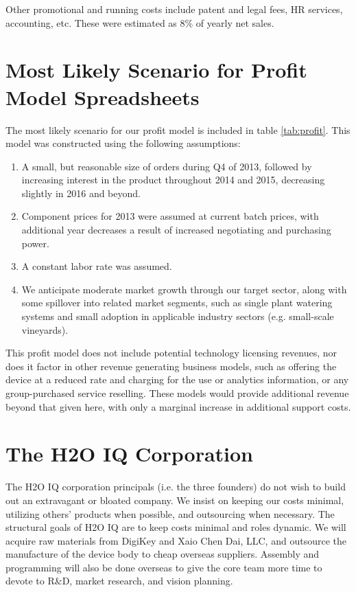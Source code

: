 \documentclass[11pt]{article}
\begin{document}
Other promotional and running costs include patent and legal fees, HR services, accounting, etc. These were estimated as 8\% of yearly net sales.

\section{Most Likely Scenario for Profit Model Spreadsheets}

The most likely scenario for our profit model is included in table \ref{tab:profit}. This model was constructed using the following assumptions:
\begin{enumerate}
\item A small, but reasonable size of orders during Q4 of 2013, followed by increasing interest in the product throughout 2014 and 2015, decreasing slightly in 2016 and beyond.
\item Component prices for 2013 were assumed at current batch prices, with additional year decreases a result of increased negotiating and purchasing power.
\item A constant labor rate was assumed.
\item We anticipate moderate market growth through our target sector, along with some spillover into related market segments, such as single plant watering systems and small adoption in applicable industry sectors (e.g. small-scale vineyards).
\end{enumerate}

This profit model does not include potential technology licensing revenues, nor does it factor in other revenue generating business models, such as offering the device at a reduced rate and charging for the use or analytics information, or any group-purchased service reselling. These models would provide additional revenue beyond that given here, with only a marginal increase in additional support costs.

\section{The H2O IQ Corporation}

The H2O IQ corporation principals (i.e. the three founders) do not wish to build out an extravagant or bloated company.  We insist on keeping our costs minimal, utilizing others' products when possible, and outsourcing when necessary.  The structural goals of H2O IQ are to keep costs minimal and roles dynamic.  We will acquire raw materials from DigiKey and Xaio Chen Dai, LLC, and outsource the manufacture of the device body to cheap overseas suppliers.  Assembly and programming will also be done overseas to give the core team more time to devote to R\&D, market research, and vision planning.
\end{document}
